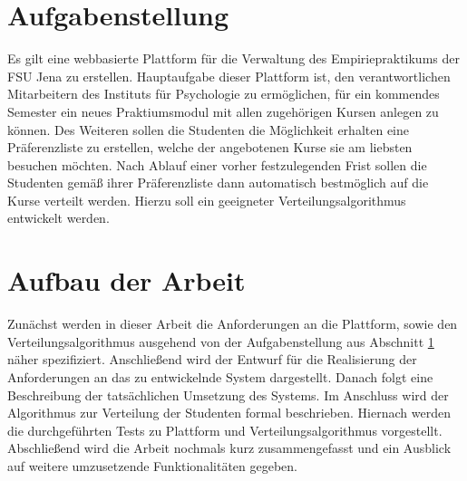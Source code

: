     \section{Aufgabenstellung}
    \label{sec:task}
        Es gilt eine webbasierte Plattform für die Verwaltung des Empiriepraktikums der FSU Jena zu erstellen.
        Hauptaufgabe dieser Plattform ist, den verantwortlichen Mitarbeitern des Instituts für Psychologie zu ermöglichen, für ein kommendes Semester ein neues Praktiumsmodul mit allen zugehörigen Kursen anlegen zu können.
        Des Weiteren sollen die Studenten die Möglichkeit erhalten eine Präferenzliste zu erstellen, welche der angebotenen Kurse sie am liebsten besuchen möchten.
        Nach Ablauf einer vorher festzulegenden Frist sollen die Studenten gemäß ihrer Präferenzliste dann automatisch bestmöglich auf die Kurse verteilt werden.
        Hierzu soll ein geeigneter Verteilungsalgorithmus entwickelt werden.


    \section{Aufbau der Arbeit}
    \label{sec:structure}
       Zunächst werden in dieser Arbeit die Anforderungen an die Plattform, sowie den Verteilungsalgorithmus ausgehend von der Aufgabenstellung aus Abschnitt \ref{sec:task} näher spezifiziert.
       Anschließend wird der Entwurf für die Realisierung der Anforderungen an das zu entwickelnde System dargestellt.
       Danach folgt eine Beschreibung der tatsächlichen Umsetzung des Systems.
       Im Anschluss wird der Algorithmus zur Verteilung der Studenten formal beschrieben.
       Hiernach werden die durchgeführten Tests zu Plattform und Verteilungsalgorithmus vorgestellt.
       Abschließend wird die Arbeit nochmals kurz zusammengefasst und ein Ausblick auf weitere umzusetzende Funktionalitäten gegeben.
       
